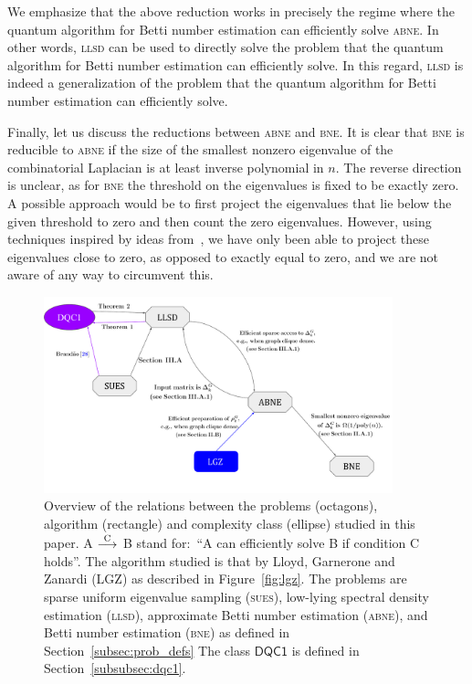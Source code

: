 \documentclass[a4paper, onecolumn, accepted=2022-08-28]{quantumarticle}
\begin{document}
We emphasize that the above reduction works in precisely the regime where the quantum algorithm for Betti number estimation can efficiently solve \textsc{abne}.
In other words, \textsc{llsd} can be used to directly solve the problem that the quantum algorithm for Betti number estimation can efficiently solve.
In this regard, \textsc{llsd} is indeed a generalization of the problem that the quantum algorithm for Betti number estimation can efficiently solve.

Finally, let us discuss the reductions between \textsc{abne} and \textsc{bne}.
It is clear that \textsc{bne} is reducible to \textsc{abne} if the size of the smallest nonzero eigenvalue of the combinatorial Laplacian is at least inverse polynomial in $n$.
The reverse direction is unclear, as for \textsc{bne} the threshold on the eigenvalues is fixed to be exactly zero.
A possible approach would be to first project the eigenvalues that lie below the given threshold to zero and then count the zero eigenvalues.
However, using techniques inspired by ideas from~\cite{gilyen:block, kitaev:book}, we have only been able to project these eigenvalues close to zero, as opposed to exactly equal to zero, and we are not aware of any way to circumvent this.

\begin{figure}
\includegraphics[width=0.9\textwidth]{diagram}%
\captionsetup{justification=raggedright}
\caption{\label{fig:reductions} Overview of the relations between the problems (octagons), algorithm (rectangle) and complexity class (ellipse) studied in this paper. 
A $\stackrel{\rm C}{\longrightarrow}$ B stand for:\ ``A can efficiently solve B if condition C holds''.
The algorithm studied is that by Lloyd, Garnerone and Zanardi (LGZ) as described in Figure~\ref{fig:lgz}.
The problems are sparse uniform eigenvalue sampling (\textsc{sues}), low-lying spectral density estimation (\textsc{llsd}), approximate Betti number estimation (\textsc{abne}), and Betti number estimation (\textsc{bne}) as defined in Section~\ref{subsec:prob_defs}
The class $\mathsf{DQC1}$ is defined in Section~\ref{subsubsec:dqc1}.}
\end{figure}
\end{document}
